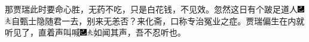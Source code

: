 那贾瑞此时要命心胜，无药不吃，只是白花钱，不见效。忽然这日有个跛足道人{\includegraphics[width=3mm]{../Images/00003}\includegraphics[width=3mm]{../Images/00012}\footnotesize \kaishu 自甄士隐随君一去，别来无恙否？}来化斋，口称专治冤业之症。贾瑞偏生在内就听见了，直着声叫喊{\includegraphics[width=3mm]{../Images/00003}\includegraphics[width=3mm]{../Images/00012}\footnotesize \kaishu 如闻其声，吾不忍听也。}